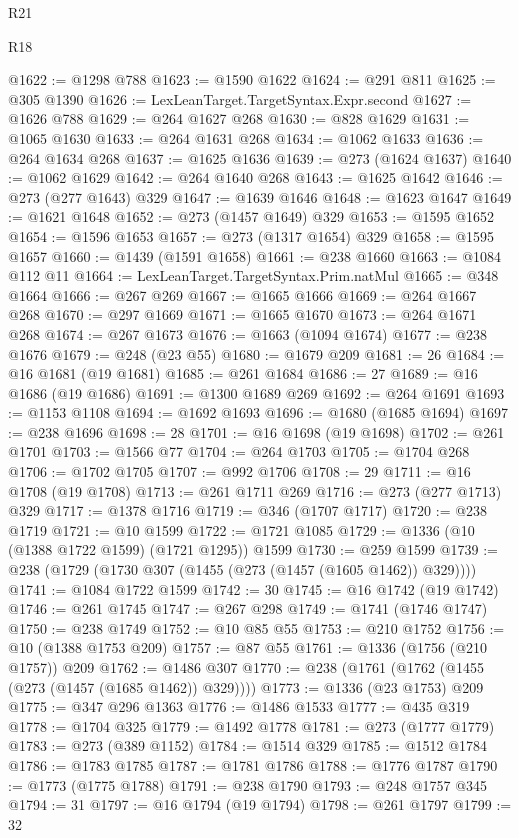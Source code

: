 \begin{lexlean}{R21}
\begin{lexlean}{R18}
\begin{coremodule}
{{{{{{{{{{{{{{{{{{{{{{{{{{{{{{{{{{{{{{{{{{{{{{{{{{{{{{{{{{{{{{{{{{{{{{{{{{{{{{{{{{{{{{{{{{{{{{{{{{{{{{{{{{{{{{{{{{{{{{{{{{{{{{{{{{{{{{{{{{{{{{{@1622 := @1298 @788
@1623 := @1590 @1622
@1624 := @291 @811
@1625 := @305 @1390
@1626 := LexLeanTarget.TargetSyntax.Expr.second
@1627 := @1626 @788
@1629 := @264 @1627 @268
@1630 := @828 @1629
@1631 := @1065 @1630
@1633 := @264 @1631 @268
@1634 := @1062 @1633
@1636 := @264 @1634 @268
@1637 := @1625 @1636
@1639 := @273 (@1624 @1637)
@1640 := @1062 @1629
@1642 := @264 @1640 @268
@1643 := @1625 @1642
@1646 := @273 (@277 @1643) @329
@1647 := @1639 @1646
@1648 := @1623 @1647
@1649 := @1621 @1648
@1652 := @273 (@1457 @1649) @329
@1653 := @1595 @1652
@1654 := @1596 @1653
@1657 := @273 (@1317 @1654) @329
@1658 := @1595 @1657
@1660 := @1439 (@1591 @1658)
@1661 := @238 @1660
@1663 := @1084 @112 @11
@1664 := LexLeanTarget.TargetSyntax.Prim.natMul
@1665 := @348 @1664
@1666 := @267 @269
@1667 := @1665 @1666
@1669 := @264 @1667 @268
@1670 := @297 @1669
@1671 := @1665 @1670
@1673 := @264 @1671 @268
@1674 := @267 @1673
@1676 := @1663 (@1094 @1674)
@1677 := @238 @1676
@1679 := @248 (@23 @55)
@1680 := @1679 @209
@1681 := 26
@1684 := @16 @1681 (@19 @1681)
@1685 := @261 @1684
@1686 := 27
@1689 := @16 @1686 (@19 @1686)
@1691 := @1300 @1689 @269
@1692 := @264 @1691
@1693 := @1153 @1108
@1694 := @1692 @1693
@1696 := @1680 (@1685 @1694)
@1697 := @238 @1696
@1698 := 28
@1701 := @16 @1698 (@19 @1698)
@1702 := @261 @1701
@1703 := @1566 @77
@1704 := @264 @1703
@1705 := @1704 @268
@1706 := @1702 @1705
@1707 := @992 @1706
@1708 := 29
@1711 := @16 @1708 (@19 @1708)
@1713 := @261 @1711 @269
@1716 := @273 (@277 @1713) @329
@1717 := @1378 @1716
@1719 := @346 (@1707 @1717)
@1720 := @238 @1719
@1721 := @10 @1599
@1722 := @1721 @1085
@1729 := @1336 (@10 (@1388 @1722 @1599) (@1721 @1295)) @1599
@1730 := @259 @1599
@1739 := @238 (@1729 (@1730 @307 (@1455 (@273 (@1457 (@1605 @1462)) @329))))
@1741 := @1084 @1722 @1599
@1742 := 30
@1745 := @16 @1742 (@19 @1742)
@1746 := @261 @1745
@1747 := @267 @298
@1749 := @1741 (@1746 @1747)
@1750 := @238 @1749
@1752 := @10 @85 @55
@1753 := @210 @1752
@1756 := @10 (@1388 @1753 @209)
@1757 := @87 @55
@1761 := @1336 (@1756 (@210 @1757)) @209
@1762 := @1486 @307
@1770 := @238 (@1761 (@1762 (@1455 (@273 (@1457 (@1685 @1462)) @329))))
@1773 := @1336 (@23 @1753) @209
@1775 := @347 @296 @1363
@1776 := @1486 @1533
@1777 := @435 @319
@1778 := @1704 @325
@1779 := @1492 @1778
@1781 := @273 (@1777 @1779)
@1783 := @273 (@389 @1152)
@1784 := @1514 @329
@1785 := @1512 @1784
@1786 := @1783 @1785
@1787 := @1781 @1786
@1788 := @1776 @1787
@1790 := @1773 (@1775 @1788)
@1791 := @238 @1790
@1793 := @248 @1757 @345
@1794 := 31
@1797 := @16 @1794 (@19 @1794)
@1798 := @261 @1797
@1799 := 32
}}}}}}}}}}}}}}}}}}}}}}}}}}}}}}}}}}}}}}}}}}}}}}}}}}}}}}}}}}}}}}}}}}}}}}}}}}}}}}}}}}}}}}}}}}}}}}}}}}}}}}}}}}}}}}}}}}}}}}}}}}}}}}}}}}}}}}}}}}}}}}}
\end{coremodule}
\end{lexlean}
\end{lexlean}
